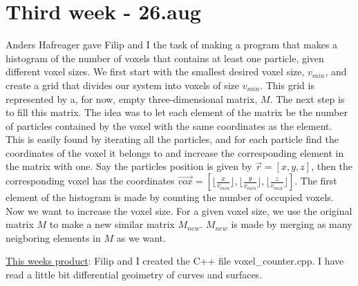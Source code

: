 \section{Third week - 26.aug}
Anders Hafreager gave Filip and I the task of making a program that makes a histogram of the number of voxels that contains at least one particle, given different voxel sizes. We first start with the smallest desired voxel size, $v_{min}$, and create a grid that divides our system into voxels of size $v_{min}$. This grid is represented by a, for now, empty three-dimensional matrix, $M$. The next step is to fill this matrix. The idea was to let each element of the matrix be the number of particles contained by the voxel with the same coordinates as the element. This is easily found by iterating all the particles, and for each particle find the coordinates of the voxel it belongs to and increase the corresponding element in the matrix with one. Say the particles position is given by $\vec{r} = [x,y,z]$, then the corresponding voxel has the coordinates $\vec{vox} = [\lfloor \frac{x}{v_{min}}\rfloor, \lfloor \frac{y}{v_{min}}\rfloor, \lfloor \frac{z}{v_{min}}\rfloor]$. The first element of the histogram is made by counting the number of occupied voxels. Now we want to increase the voxel size. For a given voxel size, we use the original matrix $M$ to make a new similar matrix $M_{new}$. $M_{new}$ is made by merging as many neigboring elements in $M$ as we want.\\
\begin{framed}
\underline{This weeks product}: Filip and I created the C++ file voxel\_counter.cpp. I have read a little bit differential geoimetry of curves and surfaces. 
\end{framed}